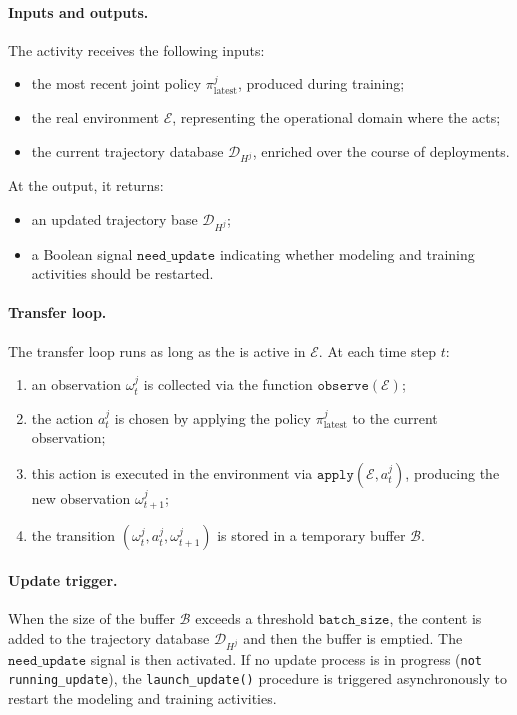 \paragraph{Inputs and outputs.}
The activity receives the following inputs:
\begin{itemize}
  \item the most recent joint policy $\pi^j_{\text{latest}}$, produced during training;
  \item the real environment $\mathcal{E}$, representing the operational domain where the  acts;
  \item the current trajectory database $\mathcal{D}_{H^j}$, enriched over the course of deployments.
\end{itemize}
At the output, it returns:
\begin{itemize}
  \item an updated trajectory base $\mathcal{D}_{H^j}$;
  \item a Boolean signal $\texttt{need\_update}$ indicating whether modeling and training activities should be restarted.
\end{itemize}

\paragraph{Transfer loop.}
The transfer loop runs as long as the  is active in $\mathcal{E}$.
At each time step $t$:
\begin{enumerate}
  \item an observation $\omega^j_t$ is collected via the function $\texttt{observe}(\mathcal{E})$;
  \item the action $a^j_t$ is chosen by applying the policy $\pi^j_{\text{latest}}$ to the current observation;
  \item this action is executed in the environment via $\texttt{apply}(\mathcal{E}, a^j_t)$, producing the new observation $\omega^j_{t+1}$;
  \item the transition $(\omega^j_t, a^j_t, \omega^j_{t+1})$ is stored in a temporary buffer $\mathcal{B}$.
\end{enumerate}

\paragraph{Update trigger.}
When the size of the buffer $\mathcal{B}$ exceeds a threshold $\texttt{batch\_size}$, the content is added to the trajectory database $\mathcal{D}_{H^j}$ and then the buffer is emptied.
The $\texttt{need\_update}$ signal is then activated.
If no update process is in progress (\texttt{not running\_update}), the \texttt{launch\_update()} procedure is triggered asynchronously to restart the modeling and training activities.


